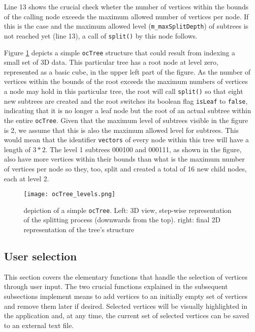 Line 13 shows the crucial check wheter the number of vertices within the bounds of the calling node exceeds the maximum allowed number of vertices per node. If this is the case and the maximum allowed level (\texttt{m\_maxSplitDepth}) of subtrees is not reached yet (line 13), a call of \texttt{split()} by this node follows.

Figure \ref{fig:ocTree_levels.png} depicts a simple \texttt{ocTree} structure that could result from indexing a small set of 3D data. This particular tree has a root node at level zero, represented as a basic cube, in the upper left part of the figure. As the number of vertices within the bounds of the root exceeds the maximum numbers of vertices a node may hold in this particular tree, the root will call \texttt{split()} so that eight new subtrees are created and the root switches its boolean flag \texttt{isLeaf} to \texttt{false}, indicating that it is no longer a leaf node but the root of an actual subtree within the entire \texttt{ocTree}. Given that the maximum level of subtrees visible in the figure is 2, we assume that this is also the maximum allowed level for subtrees. This would mean that the identifier \texttt{vectors} of every node within this tree will have a length of $3*2$. The level 1 subtrees 000100 and 000111, as shown in the figure, also have more vertices within their bounds than what is the maximum number of vertices per node so they, too, split and created a total of 16 new child nodes, each at level 2.

\begin{figure}[htb]
  \centering
  \texttt{[image: ocTree\_levels.png]}
  \caption{depiction of a simple \texttt{ocTree}. Left: 3D view, step-wise representation of the splitting process (downwards from the top). right: final 2D representation of the tree's structure}\label{fig:ocTree_levels.png}
\end{figure}


\pagebreak %
\subsection{User selection}
\label{sec:user_selection}

This section covers the elementary functions that handle the selection of vertices through user input. The two crucial functions explained in the subsequent subsections implement means to add vertices to an initially empty set of vertices and remove them later if desired. Selected vertices will be visually highlighted in the application and, at any time, the current set of selected vertices can be saved to an external text file.


